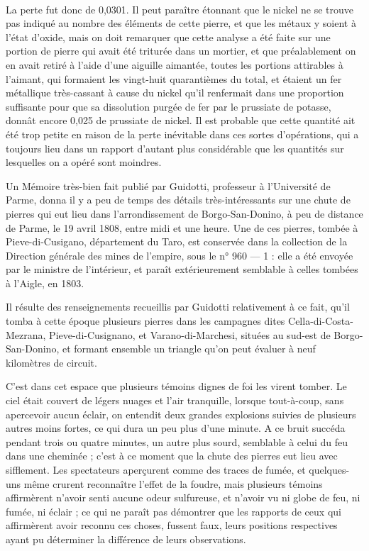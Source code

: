 \documentclass[a4paper, 12pt, oneside, french]{article}
\begin{document}
\paragraph{}
La perte fut donc de 0,0301. Il peut paraître étonnant que le nickel ne se trouve pas indiqué au nombre des éléments de cette pierre, et que les métaux y soient à l'état d'oxide, mais on doit remarquer que cette analyse a été faite sur une portion de pierre qui avait été triturée dans un mortier, et que préalablement on en avait retiré à l'aide d'une aiguille aimantée, toutes les portions attirables à l'aimant, qui formaient les vingt-huit quarantièmes du total, et étaient un fer métallique très-cassant à cause du nickel qu'il renfermait dans une proportion suffisante pour que sa dissolution purgée de fer par le prussiate de potasse, donnât encore 0,025 de prussiate de nickel. Il est probable que cette quantité ait été trop petite en raison de la perte inévitable dans ces sortes d'opérations, qui a toujours lieu dans un rapport d'autant plus considérable que les quantités sur lesquelles on a opéré sont moindres.

Un Mémoire très-bien fait publié par Guidotti, professeur à l'Université de Parme, donna il y a peu de temps des détails très-intéressants sur une chute de pierres qui eut lieu dans l'arrondissement de Borgo-San-Donino, à peu de distance de Parme, le 19 avril 1808, entre midi et une heure. Une de ces pierres, tombée à Pieve-di-Cusigano, département du Taro, est conservée dans la collection de la Direction générale des mines de l'empire, sous le n° 960 --- 1 : elle a été envoyée par le ministre de l'intérieur, et paraît extérieurement semblable à celles tombées à l'Aigle, en 1803.

Il résulte des renseignements recueillis par Guidotti relativement à ce fait, qu'il tomba à cette époque plusieurs pierres dans les campagnes dites Cella-di-Costa-Mezrana, Pieve-di-Cusignano, et Varano-di-Marchesi, situées au sud-est de Borgo-San-Donino, et formant ensemble un triangle qu'on peut évaluer à neuf kilomètres de circuit.

C'est dans cet espace que plusieurs témoins dignes de foi les virent tomber. Le ciel était couvert de légers nuages et l'air tranquille, lorsque tout-à-coup, sans apercevoir aucun éclair, on entendit deux grandes explosions suivies de plusieurs autres moins fortes, ce qui dura un peu plus d'une minute. A ce bruit succéda pendant trois ou quatre minutes, un autre plus sourd, semblable à celui du feu dans une cheminée ; c'est à ce moment que la chute des pierres eut lieu avec sifflement. Les spectateurs aperçurent comme des traces de fumée, et quelques-uns même crurent reconnaître l'effet de la foudre, mais plusieurs témoins affirmèrent n'avoir senti aucune odeur sulfureuse, et n'avoir vu ni globe de feu, ni fumée, ni éclair ; ce qui ne paraît pas démontrer que les rapports de ceux qui affirmèrent avoir reconnu ces choses, fussent faux, leurs positions respectives ayant pu déterminer la différence de leurs observations.
\end{document}
